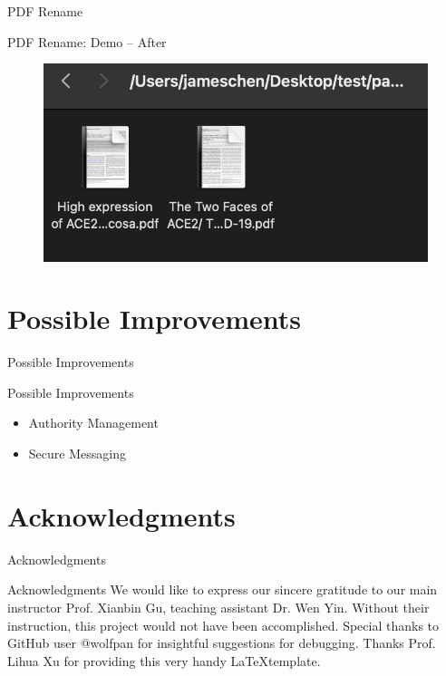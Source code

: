 \documentclass[a4paper,10pt]{beamer}
\begin{document}
\begin{frame}{PDF Rename}
\begin{block}{PDF Rename: Demo -- After}
\begin{figure}[H]
    \includegraphics[width=\textwidth]{file_rename_after.png}
\end{figure}
\end{block}
\end{frame}

\section{Possible Improvements}
\begin{frame}{Possible Improvements}
\begin{block}{Possible Improvements}
\begin{itemize}
		\item Authority Management
		\item Secure Messaging
\end{itemize}
\end{block}
\end{frame}


\section{Acknowledgments}
\begin{frame}{Acknowledgments}
\begin{block}{Acknowledgments}
We would like to express our sincere gratitude to our main instructor Prof. Xianbin Gu, teaching assistant Dr. Wen Yin. Without their instruction, this project would not have been accomplished. Special thanks to GitHub user @wolfpan for insightful suggestions for debugging. Thanks Prof. Lihua Xu for providing this very handy \LaTeX template.
\end{block}
\end{frame}
\end{document}
